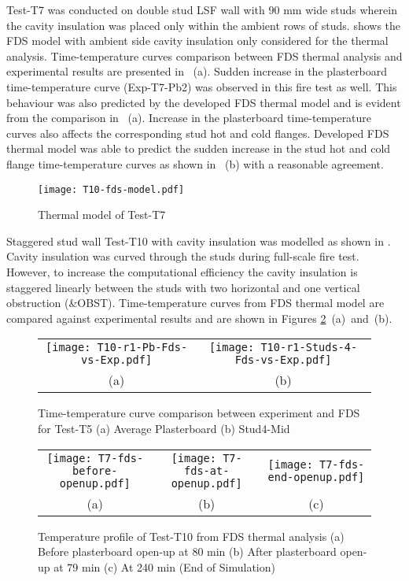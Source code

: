 Test-T7 was conducted on double stud LSF wall with 90 mm wide studs wherein the cavity insulation was placed only within the ambient rows of studs.  shows the FDS model with ambient side cavity insulation only considered for the thermal analysis. Time-temperature curves comparison between FDS thermal analysis and experimental results are presented in ~(a). Sudden increase in the plasterboard time-temperature curve (Exp-T7-Pb2) was observed in this fire test as well. This behaviour was also predicted by the developed FDS thermal model and is evident from the comparison in ~(a). Increase in the plasterboard time-temperature curves also affects the corresponding stud hot and cold flanges. Developed FDS thermal model was able to predict the sudden increase in the stud hot and cold flange time-temperature curves as shown in ~(b) with a reasonable agreement. 
\begin{figure}[!htbp]
	\centering
		\texttt{[image: T10-fds-model.pdf]}
		\caption{Thermal model of Test-T7}
		\label{fig:T10-fds-model-cavity}
\end{figure}

Staggered stud wall Test-T10 with cavity insulation was modelled as shown in . Cavity insulation was curved through the studs during full-scale fire test. However, to increase the computational efficiency the cavity insulation is staggered linearly between the studs with two horizontal and one vertical obstruction (\&OBST). Time-temperature curves from FDS thermal model are compared against experimental results and are shown in Figures \ref{fig:fds-output-pb-studs-t10}~(a)~and~(b).
\begin{figure}[!htbp]
	\centering
		\begin{tabular}{cc}
			\texttt{[image: T10-r1-Pb-Fds-vs-Exp.pdf]} & \texttt{[image: T10-r1-Studs-4-Fds-vs-Exp.pdf]} \\
			(a) & (b) \\
		\end{tabular} 
		\caption{Time-temperature curve comparison between experiment and FDS for Test-T5 (a) Average Plasterboard (b) Stud4-Mid}
		\label{fig:fds-output-pb-studs-t10}
\end{figure}
\begin{figure}[!htbp]
	\begin{center}
		\begin{tabular}{ccc}
			\texttt{[image: T7-fds-before-openup.pdf]} &
			\texttt{[image: T7-fds-at-openup.pdf]} &
			\texttt{[image: T7-fds-end-openup.pdf]}\\
			(a) & (b)& (c)\\
		\end{tabular} 
		\caption{Temperature profile of Test-T10 from FDS thermal analysis (a) Before plasterboard open-up at 80 min (b) After plasterboard open-up at 79 min (c) At 240 min (End of Simulation)}
		\label{fig:T10-fds-output}
	\end{center}
\end{figure}

